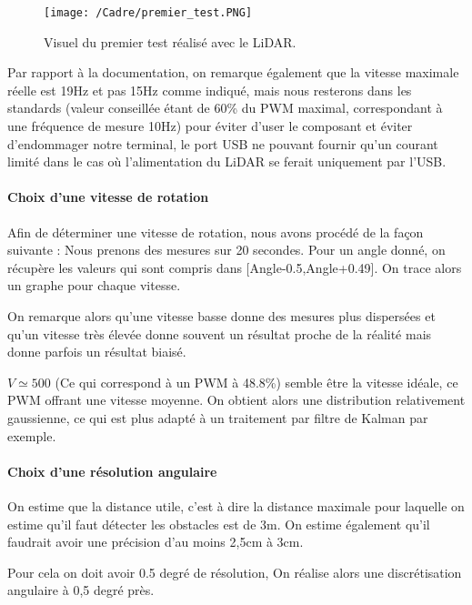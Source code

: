 \begin{figure}[htp]
    \centering
    \texttt{[image: /Cadre/premier\_test.PNG]}
    \caption{Visuel du premier test réalisé avec le LiDAR.}
\end{figure}

\tab Par rapport à la documentation, on remarque également que la vitesse maximale réelle est 19Hz et pas 15Hz comme indiqué, mais nous resterons dans les standards (valeur conseillée étant de 60\% du PWM maximal, correspondant à une fréquence de mesure 10Hz) pour éviter d'user le composant et éviter d'endommager notre terminal, le port USB ne pouvant fournir qu'un courant limité dans le cas où l'alimentation du LiDAR se ferait uniquement par l'USB.

\paragraph{Choix d'une vitesse de rotation}

\tab Afin de déterminer une vitesse de rotation, nous avons procédé de la façon suivante :
Nous prenons des mesures sur 20 secondes. Pour un angle donné, on récupère les valeurs qui sont compris dans [Angle-0.5,Angle+0.49]. On trace alors un graphe pour chaque vitesse.

\tab On remarque alors qu'une vitesse basse donne des mesures plus dispersées et qu'un vitesse très élevée donne souvent un résultat proche de la réalité mais donne parfois un résultat biaisé.

\tab $ V \simeq 500$ (Ce qui correspond à un PWM à 48.8\%) semble être la vitesse idéale, ce PWM offrant une vitesse moyenne. On obtient alors une distribution relativement gaussienne, ce qui est plus adapté à un traitement par filtre de Kalman par exemple.


\paragraph{Choix d'une résolution angulaire}
\tab On estime que la distance utile, c'est à dire la distance maximale pour laquelle on estime qu'il faut détecter les obstacles est de 3m.
On estime également qu'il faudrait avoir une précision d'au moins 2,5cm à 3cm.

\tab Pour cela on doit avoir 0.5 degré de résolution, On réalise alors une discrétisation angulaire à 0,5 degré près. 


